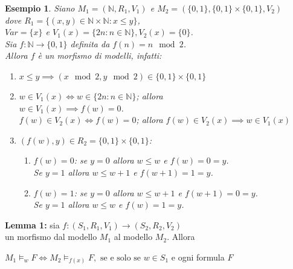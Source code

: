 \documentclass[a4paper,12pt]{article}
\theoremstyle{def}
\theoremstyle{prop}
\theoremstyle{esempio}
\newtheorem*{example}{Esempio}
\theoremstyle{dimostrazione}
\theoremstyle{teo}
\theoremstyle{osservazione}
\begin{document}
\begin{example}
	Siano \(M_1 = (\mathbb{N}, R_1, V_1)\) e \(M_2 = (\{0,1\}, \{0,1\} \times \{0,1\}, V_2)\)\\
	dove \(R_1 = \{(x,y) \in \mathbb{N} \times \mathbb{N} : x \leq y\}\),\\
	\(Var = \{x\}\) e \(V_1(x)= \{2n : n \in \mathbb{N}\}, V_2(x) = \{0\}\).\\
	Sia \(f: \mathbb{N} \rightarrow \{0,1\}\) definita da \(f(n) = n \mod 2\).\\
	Allora \(f\) è un morfismo di modelli, infatti:
	\begin{enumerate}
		\item \(x \leq y \implies (x \mod 2, y \mod 2) \in \{0,1\} \times \{0,1\}\)
		\item \(w \in V_1(x) \iff w \in \{2n: n \in \mathbb{N}\}\); allora\\
				\(w \in V_1(x) \implies f(w) = 0\).\\
				\(f(w) \in V_2(x) \iff f(w) = 0 \); allora \(f(w) \in V_2(x) \implies w \in V_1(x)\)
		\item \((f(w),y) \in R_2 = \{0,1\} \times \{0,1\}\):
				\begin{enumerate}
					\item \(f(w) = 0\): se \(y=0\) allora \(w \leq w\) e \(f(w) = 0 = y\).\\
							Se \(y=1\) allora \(w \leq w+1\) e \(f(w+1) = 1 = y\).
					\item \(f(w) = 1\): se \(y=0\) allora \(w \leq w + 1\) e \(f(w + 1) = 0 = y\).\\
							Se \(y=1\) allora \(w \leq w\) e \(f(w) = 1 = y\).\\
				\end{enumerate}
	\end{enumerate}
\end{example}
\newpage
\textbf{Lemma 1:} sia \(f: (S_1, R_1, V_1) \rightarrow (S_2, R_2, V_2)\)\\
un morfismo dal modello \(M_1\) al modello \(M_2\). Allora
\begin{center}
	\(M_1 \vDash_w F \iff M_2 \vDash_{f(x)} F, \text{ se e solo se } w \in S_1\) e ogni  formula \(F\)
\end{center}
\end{document}
